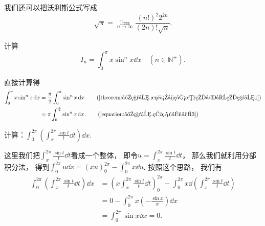 我们还可以把\hyperref[equation:定积分.沃利斯公式]{沃利斯公式}写成\begin{equation}
	\sqrt\pi
	= \lim_{n\to\infty} \frac{(n!)^2 2^{2n}}{(2n)! \sqrt{n}}.
\end{equation}

\begin{example}
计算\[
	I_n = \int_0^\pi x \sin^n x \dd{x}
	\quad(n\in\mathbb{N}^+).
\]
\begin{solution}
直接计算得\begin{align*}
	\int_0^\pi x \sin^n x \dd{x}
	&= \frac\pi2 \int_0^\pi \sin^n x \dd{x}
		\tag{\cref{theorem:定积分.正余弦函数的复合的积分1}} \\
	&= \pi \int_0^{\frac\pi2} \sin^n x \dd{x}.
		\tag{\cref{equation:定积分.点火公式3}}
\end{align*}
\end{solution}
\end{example}

\begin{example}
计算：\(\int_0^{2\pi}\left(\int_x^{2\pi}\frac{\sin t}{t}\dd{t}\right)\dd{x}\).
\begin{solution}
这里我们把\(\int_x^{2\pi}\frac{\sin t}{t}\dd{t}\)看成一个整体，
即令\(u = \int_x^{2\pi}\frac{\sin t}{t}\dd{t}\)，
那么我们就利用分部积分法，
得到\(\int_0^{2\pi} u \dd{x} = (x u)_0^{2\pi} - \int_0^{2\pi} x \dd{u}\).
按照这个思路，
我们有\begin{align*}
	\int_0^{2\pi}\left(\int_x^{2\pi}\frac{\sin t}{t}\dd{t}\right)\dd{x}
	&= \left(x \int_x^{2\pi}\frac{\sin t}{t}\dd{t}\right)_0^{2\pi}
	- \int_0^{2\pi} x \dd(\int_x^{2\pi}\frac{\sin t}{t}\dd{t}) \\
	&= 0 - \int_0^{2\pi} x \left(-\frac{\sin x}{x}\right) \dd{x} \\
	&= \int_0^{2\pi} \sin x \dd{x} = 0.
\end{align*}
\end{solution}
\end{example}
